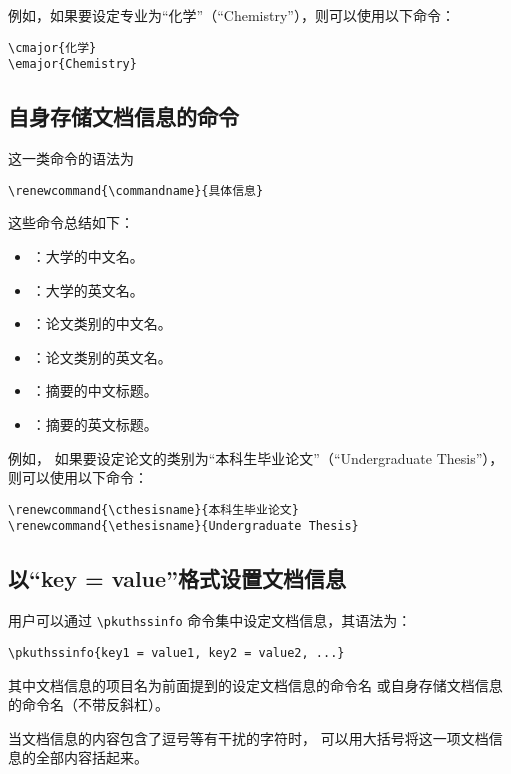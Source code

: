 例如，如果要设定专业为“化学”（“Chemistry”），则可以使用以下命令：
\begin{Verbatim}[frame = single]
\cmajor{化学}
\emajor{Chemistry}
\end{Verbatim}

\subsection{自身存储文档信息的命令}

这一类命令的语法为
\begin{Verbatim}[frame = single]
% commandname 为具体的命令名。
\renewcommand{\commandname}{具体信息}
\end{Verbatim}

这些命令总结如下：
\begin{itemize}
	\item \texttt{\bfseries\string\cuniversity}：大学的中文名。
	\item \texttt{\bfseries\string\euniversity}：大学的英文名。
	\item \texttt{\bfseries\string\cthesisname}：论文类别的中文名。
	\item \texttt{\bfseries\string\ethesisname}：论文类别的英文名。
	\item \texttt{\bfseries\string\cabstractname}：摘要的中文标题。
	\item \texttt{\bfseries\string\eabstractname}：摘要的英文标题。
\end{itemize}

例如，
如果要设定论文的类别为“本科生毕业论文”（“Undergraduate Thesis”），
则可以使用以下命令：
\begin{Verbatim}[frame = single]
\renewcommand{\cthesisname}{本科生毕业论文}
\renewcommand{\ethesisname}{Undergraduate Thesis}
\end{Verbatim}

\subsection{以“key = value”格式设置文档信息}

用户可以通过 \verb|\pkuthssinfo| 命令集中设定文档信息，其语法为：
\begin{Verbatim}[frame = single]
% key1、key2、value1、value2 等为具体文档信息的项目名和内容。
\pkuthssinfo{key1 = value1, key2 = value2, ...}
\end{Verbatim}
其中文档信息的项目名为前面提到的设定文档信息的命令名
或自身存储文档信息的命令名（不带反斜杠）。

当文档信息的内容包含了逗号等有干扰的字符时，
可以用大括号将这一项文档信息的全部内容括起来。

